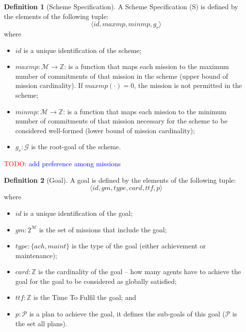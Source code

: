 \documentclass{article}
\newcommand{\todo}[1]{\textcolor{red}{TODO: }\textcolor{blue}{#1}}
\newcommand{\set}[1]{\mathcal{#1}}
\theoremstyle{definition} \newtheorem{definition}{Definition}
\begin{document}
\begin{definition}[Scheme Specification]
  A Scheme Specification (S) is defined by the elements of the following tuple:
  \begin{displaymath}
    \langle id, maxmp, minmp, g_r \rangle
  \end{displaymath}
  where
  \begin{itemize}
  \item $id$ is a unique identification of the scheme;
  \item $maxmp : \set{M} \to \mathbb{Z}$: is a function that maps each
    mission to the maximum number of commitments of that mission in
    the scheme (upper bound of mission cardinality). If $maxmp(\cdot) =
    0$, the mission is not permitted in the scheme;
  \item $minmp : \set{M} \to \mathbb{Z}$: is a function that maps each
    mission to the minimum number of commitments of that mission
    necessary for the scheme to be considered well-formed (lower bound
    of mission cardinality);
 \item $g_r : \set{G}$ is the root-goal of the scheme.
 \end{itemize}
\end{definition}

\todo{add preference among missions}

\begin{definition}[Goal]
   A goal is defined by the elements of the following tuple:
  \begin{displaymath}
    \langle id, gm, type, card, ttf, p \rangle
  \end{displaymath}
  where
  \begin{itemize}
  \item $id$ is a unique identification of the goal;
  \item $gm : 2^{\set{M}}$ is the set of missions that include the goal;
  \item $type : \{ ach, maint \}$ is the type of the goal (either achievement or maintenance);
  \item $card : \mathbb{Z}$ is the cardinality of the goal -- how many
    agents have to achieve the goal for the goal to be considered as
    globally satisfied;
  \item $ttf : \mathbb{Z}$ is the Time To Fulfil the goal; and
  \item $p : \set{P}$ is a plan to achieve the goal, it defines the
    sub-goals of this goal ($\set{P}$ is the set all plans).
\end{itemize}
\end{definition}
\end{document}
